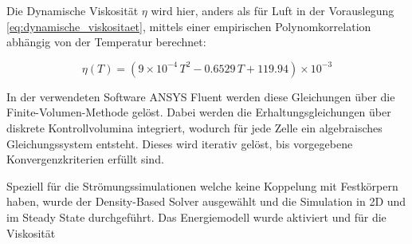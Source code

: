 Die Dynamische Viskosität $\eta$ wird hier, anders als für Luft in der Vorauslegung \ref{eq:dynamische_viskositaet}, mittels einer empirischen
Polynomkorrelation~\cite{akamcae-udf} abhängig von der Temperatur berechnet:

\begin{equation}
  \label{eq:udf_mu}
  \eta(T)= \left(9\times 10^{-4}\,T^{2} - 0.6529\,T + 119.94\right)\times 10^{-3}
\end{equation}

In der verwendeten Software ANSYS Fluent werden diese Gleichungen über die Finite-Volumen-Methode gelöst. Dabei werden die Erhaltungsgleichungen
über diskrete Kontrollvolumina integriert, wodurch für jede Zelle ein algebraisches Gleichungssystem entsteht. Dieses
wird iterativ gelöst, bis vorgegebene Konvergenzkriterien erfüllt sind.

Speziell für die Strömungssimulationen welche keine Koppelung mit Festkörpern haben, wurde der Density-Based Solver ausgewählt und die
Simulation in 2D und im Steady State durchgeführt. Das Energiemodell wurde aktiviert und für die Viskosität